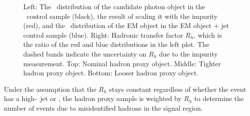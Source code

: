 \begin{figure}[htbp]
{  }
  \caption{
    \small Left: The \pt\ distribution of the candidate photon object in the \gj\ control sample (black), the result of scaling it with the impurity (red), and the \pt\ distribution of the EM object in the EM object + jet control sample (blue).
    Right: Hadronic transfer factor $R_{h}$, which is the ratio of the red and blue distributions in the left plot. The dashed bands indicate the uncertainty on $R_{h}$ due to the impurity measurement.
    Top: Nominal hadron proxy object. 
    Middle: Tighter hadron proxy object. 
    Bottom: Looser hadron proxy object.
  }
  \label{fig:hadronTFactor}
\end{figure}


Under the assumption that the $R_{h}$ stays constant regardless of whether the event has a high-\pt\ jet or \met, the hadron proxy sample is weighted by $R_{h}$ to determine the number of events due to misidentified hadrons in the signal region.

